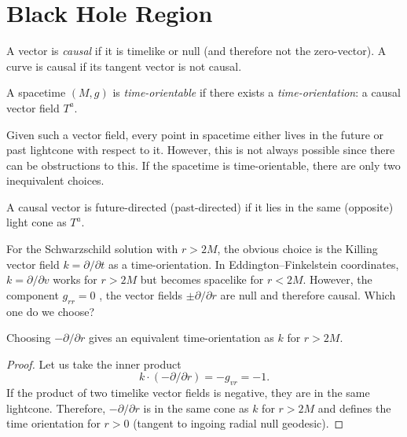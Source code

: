\section{Black Hole Region}%
\label{sec:black_hole_region}

\begin{definition}[causal]
  A vector is \emph{causal} if it is timelike or null (and therefore not the zero-vector).
  A curve is causal if its tangent vector is not causal.
\end{definition}

\begin{definition}
  A spacetime $(M, g)$ is \emph{time-orientable} if there exists a \emph{time-orientation}: a causal vector field $T^{a}$.
\end{definition}

Given such a vector field, every point in spacetime either lives in the future or past lightcone with respect to it.
However, this is not always possible since there can be obstructions to this.
If the spacetime is time-orientable, there are only two inequivalent choices.

\begin{definition}[]
  A causal vector is future-directed (past-directed) if it lies in the same (opposite) light cone as $T^{a}$.
\end{definition}

For the Schwarzschild solution with $r > 2M$, the obvious choice is the Killing vector field $k = \partial / \partial t$  as a time-orientation.
In Eddington--Finkelstein coordinates, $k = \partial / \partial v$  works for $r > 2M$ but becomes spacelike for  $r < 2M$. 
However, the component $g_{rr} = 0$ , the vector fields $\pm \partial / \partial r$  are null and therefore causal.
Which one do we choose?
\begin{claim}
  Choosing $- \partial / \partial r$ gives an equivalent time-orientation as $k$ for $r > 2M$.
\end{claim}
\begin{proof}
  Let us take the inner product
  \begin{equation}
    k \cdot (- \partial / \partial r) = - g_{vr} = -1.
  \end{equation}
  If the product of two timelike vector fields is negative, they are in the same lightcone.
  Therefore, $-\partial / \partial r$ is in the same cone as $k$ for $r > 2M$ and defines the time orientation for $r > 0$ (tangent to ingoing radial null geodesic).
\end{proof}

